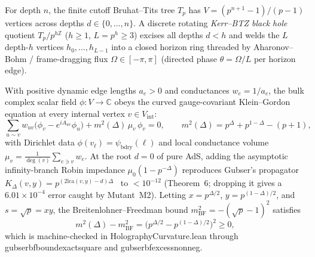 \documentclass[11pt,a4paper]{article}
\numberwithin{equation}{section}
\theoremstyle{plain}
\theoremstyle{definition}
\theoremstyle{remark}
\newcommand{\Z}{\mathbb{Z}}
\newcommand{\C}{\mathbb{C}}
\newcommand{\Tp}{T_p}
\newcommand{\lca}{\mathrm{lca}}
\newcommand{\code}[1]{{\ttfamily\footnotesize\def\_{\textunderscore\penalty0\hskip0pt}#1}}
\begin{document}
For depth $n$, the finite cutoff Bruhat--Tits tree $\Tp$ has $V = (p^{n+1}-1)/(p-1)$ vertices across depths $d \in \{0,\dots,n\}$. A discrete rotating \emph{Kerr--BTZ black hole} quotient $\Tp / p^{h\Z}$ ($h \ge 1$, $L = p^h \ge 3$) excises all depths $d < h$ and welds the $L$ depth-$h$ vertices $h_0,\dots,h_{L-1}$ into a closed horizon ring threaded by Aharonov--Bohm / frame-dragging flux $\Omega \in [-\pi, \pi]$ (directed phase $\theta = \Omega/L$ per horizon edge).

With positive dynamic edge lengths $a_e > 0$ and conductances $w_e = 1/a_e$, the bulk complex scalar field $\phi : V \to \C$ obeys the curved gauge-covariant Klein--Gordon equation at every internal vertex $v \in V_{\mathrm{int}}$:
\begin{equation}
  \sum_{u \sim v} w_{uv}\bigl(\phi_v - e^{i A_{uv}} \phi_u\bigr) + m^2(\Delta)\,\mu_v\,\phi_v = 0, \qquad
  m^2(\Delta) = p^\Delta + p^{1-\Delta} - (p+1),
  \label{eq:kg}
\end{equation}
with Dirichlet data $\phi(v_\ell) = \psi_{\mathrm{bdry}}(\ell)$ and local conductance volume $\mu_v = \frac{1}{\deg(v)}\sum_{e\ni v} w_e$. At the root $d = 0$ of pure AdS, adding the asymptotic infinity-branch Robin impedance $\mu_0(1 - p^{-\Delta})$ reproduces Gubser's propagator $K_\Delta(v, y) = p^{(2\lca(v,y)-d)\Delta}$~\cite{Gubser2017} to $< 10^{-12}$ (\code{Theorem~6}; dropping it gives a $6.01\times 10^{-4}$ error caught by Mutant~M2). Letting $x = p^{\Delta/2}$, $y = p^{(1-\Delta)/2}$, and $s = \sqrt{p} = xy$, the Breitenlohner--Freedman bound $m_{\mathrm{BF}}^2 = -(\sqrt{p}-1)^2$ satisfies
\begin{equation}
  m^2(\Delta) - m_{\mathrm{BF}}^2 = \bigl(p^{\Delta/2} - p^{(1-\Delta)/2}\bigr)^2 \ge 0,
  \label{eq:bf-square}
\end{equation}
which is machine-checked in \code{HolographyCurvature.lean} through \code{gubser\_bf\_bound\_exact\_square} and \code{gubser\_bf\_excess\_nonneg}.
\end{document}
